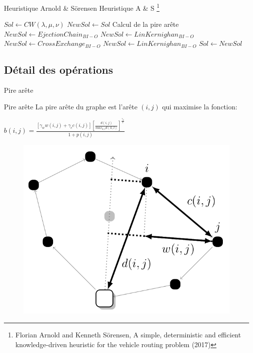 \documentclass{beamer}
\begin{document}
\begin{frame}{Heuristique Arnold \& Sörensen} 
Heuristique A \& S \footnote{Florian Arnold and Kenneth Sörensen, A simple, deterministic and efficient knowledge-driven heuristic for the vehicle routing problem (2017)}
\begin{algorithm}[H]
\DontPrintSemicolon %

$Sol \gets CW(\lambda,\mu,\nu)$\;
$NewSol \gets Sol$\;
 {
	Calcul de la pire arête\;
	$NewSol \gets EjectionChain_{BI-O}$\;
	$NewSol \gets LinKernighan_{BI-O}$\;
	$NewSol \gets CrossExchange_{BI-O}$\;
	$NewSol \gets LinKernighan_{BI-O}$\;
	 {
		$Sol \gets NewSol$\;
	}
}
\;

\end{algorithm}

\end{frame}

\subsection{Détail des opérations}

\begin{frame}{Pire arête}
\begin{exampleblock}{Pire arête}
La pire arête du graphe est l'arête $(i,j)$ qui maximise la fonction:
\begin{center}
$b(i,j) = \frac{[\gamma_w w(i,j) + \gamma_c c(i,j)] [\frac{d(i,j)}{max_{k,l}d(k,l)}] ^ {\frac{\gamma_d}{2}}}{1+p(i,j)}$
\end{center}
\end{exampleblock}

\begin{figure}
\centering
\includegraphics[scale=0.2]{metrics_big.png}
\end{figure}

\end{frame}
\end{document}
